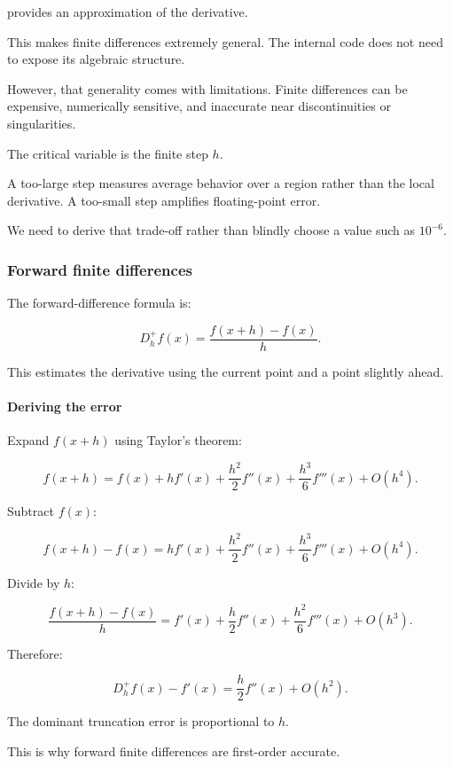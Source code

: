 provides an approximation of the derivative.

This makes finite differences extremely general. The internal code does not need to expose its algebraic structure.

However, that generality comes with limitations. Finite differences can be expensive, numerically sensitive, and inaccurate near discontinuities or singularities.

The critical variable is the finite step \(h\).

A too-large step measures average behavior over a region rather than the local derivative. A too-small step amplifies floating-point error.

We need to derive that trade-off rather than blindly choose a value such as \(10^{-6}\).

\subsubsection{Forward finite differences}\label{02-foundations-ii-ch025-forward-finite-differences}

The forward-difference formula is:

\[
\boxed{ D_h^+f(x)=\frac{f(x+h)-f(x)}h }.
\]

This estimates the derivative using the current point and a point slightly ahead.

\paragraph{Deriving the error}\label{02-foundations-ii-ch025-deriving-the-error}

Expand \(f(x+h)\) using Taylor's theorem:

\[
f(x+h) = f(x)+hf'(x)+ \frac{h^2}{2}f''(x)+ \frac{h^3}{6}f'''(x)+O(h^4).
\]

Subtract \(f(x)\):

\[
f(x+h)-f(x) = hf'(x)+ \frac{h^2}{2}f''(x)+ \frac{h^3}{6}f'''(x)+O(h^4).
\]

Divide by \(h\):

\[
\frac{f(x+h)-f(x)}h = f'(x)+ \frac h2f''(x)+ \frac{h^2}{6}f'''(x)+O(h^3).
\]

Therefore:

\[
\boxed{ D_h^+f(x)-f'(x) = \frac h2f''(x)+O(h^2) }.
\]

The dominant truncation error is proportional to \(h\).

This is why forward finite differences are first-order accurate.


